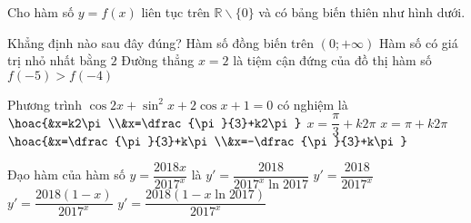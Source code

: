 \begin{ex}%
Cho hàm số $y=f(x)$ liên tục trên $\mathbb{R}\backslash\{0\}$ và có bảng biến thiên như hình dưới.
\begin{center}
	\end{center}
Khẳng định nào sau đây đúng?
\choice
{Hàm số đồng biến trên $(0;+\infty)$}
{Hàm số có giá trị nhỏ nhất bằng $2$}
{Đường thẳng $x=2$ là tiệm cận đứng của đồ thị hàm số}
{\True $f(-5)>f(-4)$}
\end{ex}
\begin{ex}%
Phương trình $\cos2x+\sin^2x+2\cos x+1=0$ có nghiệm là
\choice
{$\hoac{&x=k2\pi\\&x=\dfrac{\pi}{3}+k2\pi}$}
{$x=\dfrac{\pi}{3}+k2\pi$}
{\True $x=\pi+k2\pi$}
{$\hoac{&x=\dfrac{\pi}{3}+k\pi\\&x=-\dfrac{\pi}{3}+k\pi}$}
\end{ex}
\begin{ex}%
Đạo hàm của hàm số $y=\dfrac{2018x}{2017^x}$ là
\choice
{$y'=\dfrac{2018}{2017^x\ln2017}$}
{$y'=\dfrac{2018}{2017^x}$}
{$y'=\dfrac{2018(1-x)}{2017^x}$}
{\True $y'=\dfrac{2018(1-x\ln2017)}{2017^x}$}
\end{ex}
